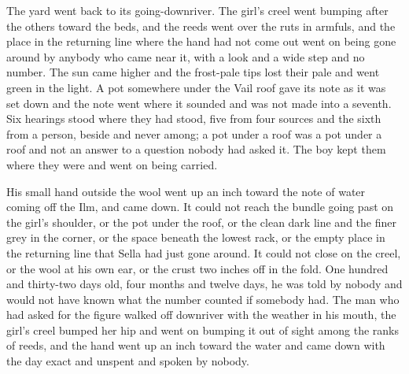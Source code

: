 The yard went back to its going-downriver. The girl's creel went bumping after the others toward the beds, and the reeds went over the ruts in armfuls, and the place in the returning line where the hand had not come out went on being gone around by anybody who came near it, with a look and a wide step and no number. The sun came higher and the frost-pale tips lost their pale and went green in the light. A pot somewhere under the Vail roof gave its note as it was set down and the note went where it sounded and was not made into a seventh. Six hearings stood where they had stood, five from four sources and the sixth from a person, beside and never among; a pot under a roof was a pot under a roof and not an answer to a question nobody had asked it. The boy kept them where they were and went on being carried.

His small hand outside the wool went up an inch toward the note of water coming off the Ilm, and came down. It could not reach the bundle going past on the girl's shoulder, or the pot under the roof, or the clean dark line and the finer grey in the corner, or the space beneath the lowest rack, or the empty place in the returning line that Sella had just gone around. It could not close on the creel, or the wool at his own ear, or the crust two inches off in the fold. One hundred and thirty-two days old, four months and twelve days, he was told by nobody and would not have known what the number counted if somebody had. The man who had asked for the figure walked off downriver with the weather in his mouth, the girl's creel bumped her hip and went on bumping it out of sight among the ranks of reeds, and the hand went up an inch toward the water and came down with the day exact and unspent and spoken by nobody.
